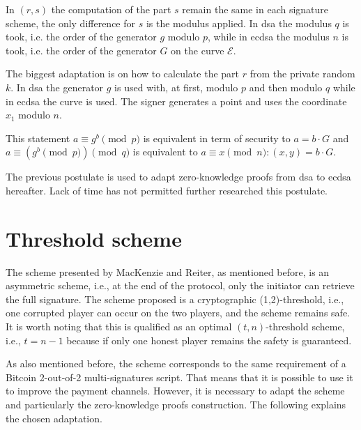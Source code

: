 In $(r, s)$ the computation of the part $s$ remain the same in each signature
scheme, the only difference for $s$ is the modulus applied. In \gls{dsa} the
modulus $q$ is took, i.e. the order of the generator $g$ modulo $p$,  while in
\gls{ecdsa} the modulus $n$ is took, i.e. the order of the generator $G$ on the
curve $\mathcal{E}$.

The biggest adaptation is on how to calculate the part $r$ from the private
random $k$. In \gls{dsa} the generator $g$ is used with, at first, modulo $p$
and then modulo $q$ while in \gls{ecdsa} the curve is used. The signer generates
a  point and uses the coordinate $x_1$ modulo $n$.

\begin{postulate}
  This statement $a \equiv g^b \pmod p$ is equivalent in term of security to $a = b \cdot G$
  and $a \equiv (g^b \pmod p) \pmod q$ is equivalent to $a \equiv x \pmod n : (x, y) = b \cdot G$.
  \label{post:adaptEcdsa}
\end{postulate}

The previous postulate is used to adapt zero-knowledge proofs from \gls{dsa} to
\gls{ecdsa} hereafter. Lack of time has not permitted further researched this
postulate.


\section{Threshold scheme}

The  scheme presented by MacKenzie
and Reiter, as mentioned before, is an asymmetric scheme, i.e., at the end of
the protocol, only the initiator can retrieve the full signature. The scheme
proposed is a cryptographic (1,2)-threshold, i.e., one corrupted player can
occur on the two players, and the scheme remains safe. It is worth noting that
this is qualified as an optimal $(t, n)$-threshold scheme, i.e., $t = n - 1$
because if only one honest player remains the safety is guaranteed.

As also mentioned before, the scheme corresponds to the same requirement of a
Bitcoin 2-out-of-2 multi-signatures script. That means that it is possible to
use it to improve the payment channels. However, it is necessary to adapt the
scheme and particularly the zero-knowledge proofs construction. The following
explains the chosen adaptation.


